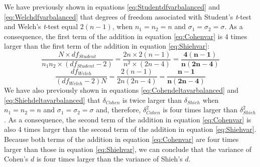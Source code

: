 \documentclass[
]{article}
\begin{document}
We have previously shown in equations \ref{eq:Studentdfvarbalanced} and
\ref{eq:Welchdfvarbalanced} that degrees of freedom associated with
Student's \emph{t}-test and Welch's \emph{t}-test equal \(2(n-1)\), when
\(n_1=n_2=n\) and \(\sigma_1=\sigma_2=\sigma\). As a consequence, the
first term of the addition in equation \ref{eq:Cohenvar} is 4 times
larger than the first term of the addition in equation
\ref{eq:Shiehvar}:
\[\frac{N\times df_{Student}}{n_1n_2 \times (df_{Student}-2)}=\frac{2n\times 2(n-1)}{n^2 \times (2n-4)} =\bm{\frac{4(n-1)}{n(2n-4)}} \]
\[\frac{df_{Welch}}{(df_{Welch}-2)N} = \frac{2(n-1)}{2n(2n-4)}= \bm{\frac{n-1}{n(2n-4)}}\]
We have also previously shown in equations
\ref{eq:Cohendeltavarbalanced} and \ref{eq:Shiehdeltavarbalanced} that
\(\delta_{Cohen}\) is twice larger than \(\delta_{Shieh}\) when
\(n_1=n_2=n\) and \(\sigma_1=\sigma_2=\sigma\) and, therefore,
\(\delta^2_{Cohen}\) is four times larger than \(\delta^2_{Shieh}\). As
a consequence, the second term of the addition in equation
\ref{eq:Cohenvar} is also 4 times larger than the second term of the
addition in equation \ref{eq:Shiehvar}. Because both terms of the
addition in equation \ref{eq:Cohenvar} are four times larger than those
in equation \ref{eq:Shiehvar}, we can conclude that the variance of
Cohen's \(d\) is four times larger than the variance of Shieh's \(d\).
\end{document}
